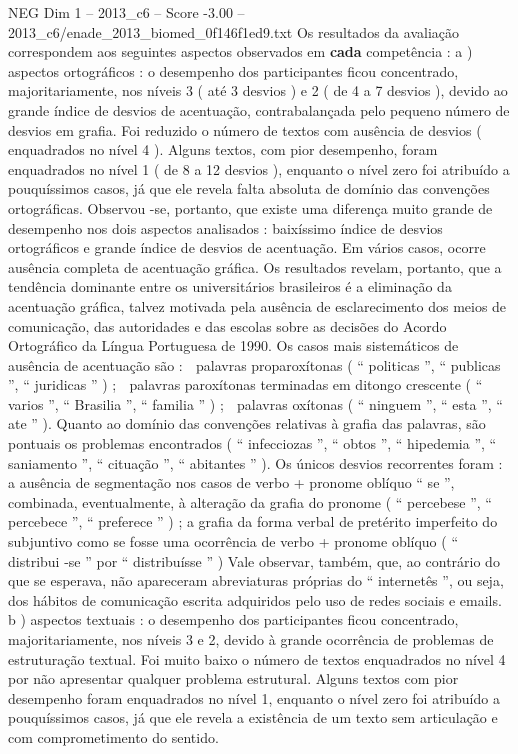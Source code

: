 \begin{textsample}{NEG Dim 1 – 2013\_c6 – Score -3.00 – 2013\_c6/enade\_2013\_biomed\_0f146f1ed9.txt}
Os resultados da avaliação correspondem aos seguintes aspectos observados em \textbf{cada} competência : a ) aspectos ortográficos : o desempenho dos participantes ficou concentrado, majoritariamente, nos níveis 3 ( até 3 desvios ) e 2 ( de 4 a 7 desvios ), devido ao grande índice de desvios de acentuação, contrabalançada pelo pequeno número de desvios em grafia.
Foi reduzido o número de textos com ausência de desvios ( enquadrados no nível 4 ).
Alguns textos, com pior desempenho, foram enquadrados no nível 1 ( de 8 a 12 desvios ), enquanto o nível zero foi atribuído a pouquíssimos casos, já que ele revela falta absoluta de domínio das convenções ortográficas.
Observou -se, portanto, que existe uma diferença muito grande de desempenho nos dois aspectos analisados : baixíssimo índice de desvios ortográficos e grande índice de desvios de acentuação.
Em vários casos, ocorre ausência completa de acentuação gráfica.
Os resultados revelam, portanto, que a tendência dominante entre os universitários brasileiros é a eliminação da acentuação gráfica, talvez motivada pela ausência de esclarecimento dos meios de comunicação, das autoridades e das escolas sobre as decisões do Acordo Ortográfico da Língua Portuguesa de 1990.
Os casos mais sistemáticos de ausência de acentuação são :  palavras proparoxítonas ( “ politicas ”, “ publicas ”, “ juridicas ” ) ;  palavras paroxítonas terminadas em ditongo crescente ( “ varios ”, “ Brasilia ”, “ familia ” ) ;  palavras oxítonas ( “ ninguem ”, “ esta ”, “ ate ” ).
Quanto ao domínio das convenções relativas à grafia das palavras, são pontuais os problemas encontrados ( “ infecciozas ”, “ obtos ”, “ hipedemia ”, “ saniamento ”, “ cituação ”, “ abitantes ” ).
Os únicos desvios recorrentes foram : a ausência de segmentação nos casos de verbo + pronome oblíquo “ se ”, combinada, eventualmente, à alteração da grafia do pronome ( “ percebese ”, “ percebece ”, “ preferece ” ) ; a grafia da forma verbal de pretérito imperfeito do subjuntivo como se fosse uma ocorrência de verbo + pronome oblíquo ( “ distribui -se ” por “ distribuísse ” ) Vale observar, também, que, ao contrário do que se esperava, não apareceram abreviaturas próprias do “ internetês ”, ou seja, dos hábitos de comunicação escrita adquiridos pelo uso de redes sociais e emails. b ) aspectos textuais : o desempenho dos participantes ficou concentrado, majoritariamente, nos níveis 3 e 2, devido à grande ocorrência de problemas de estruturação textual.
Foi muito baixo o número de textos enquadrados no nível 4 por não apresentar qualquer problema estrutural.
Alguns textos com pior desempenho foram enquadrados no nível 1, enquanto o nível zero foi atribuído a pouquíssimos casos, já que ele revela a existência de um texto sem articulação e com comprometimento do sentido.

\end{textsample}
